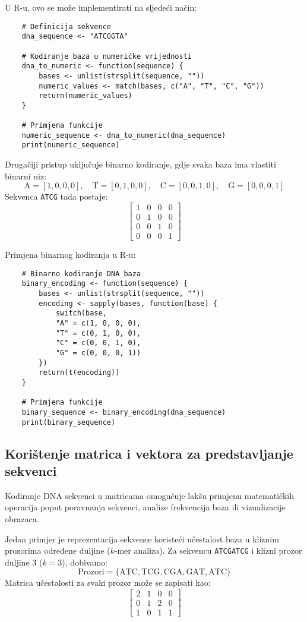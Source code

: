 \documentclass[10pt,a4paper,twoside]{article}
\begin{document}
U R-u, ovo se može implementirati na sljedeći način:
\begin{verbatim}
	# Definicija sekvence
	dna_sequence <- "ATCGGTA"
	
	# Kodiranje baza u numeričke vrijednosti
	dna_to_numeric <- function(sequence) {
		bases <- unlist(strsplit(sequence, ""))
		numeric_values <- match(bases, c("A", "T", "C", "G"))
		return(numeric_values)
	}
	
	# Primjena funkcije
	numeric_sequence <- dna_to_numeric(dna_sequence)
	print(numeric_sequence)
\end{verbatim}

Drugačiji pristup uključuje binarno kodiranje, gdje svaka baza ima vlastiti binarni niz:
\[
\text{A} = [1, 0, 0, 0], \quad \text{T} = [0, 1, 0, 0], \quad \text{C} = [0, 0, 1, 0], \quad \text{G} = [0, 0, 0, 1]
\]
Sekvenca \texttt{ATCG} tada postaje:
\[
\begin{bmatrix}
	1 & 0 & 0 & 0 \\
	0 & 1 & 0 & 0 \\
	0 & 0 & 1 & 0 \\
	0 & 0 & 0 & 1
\end{bmatrix}
\]

Primjena binarnog kodiranja u R-u:
\begin{verbatim}
	# Binarno kodiranje DNA baza
	binary_encoding <- function(sequence) {
		bases <- unlist(strsplit(sequence, ""))
		encoding <- sapply(bases, function(base) {
			switch(base,
			"A" = c(1, 0, 0, 0),
			"T" = c(0, 1, 0, 0),
			"C" = c(0, 0, 1, 0),
			"G" = c(0, 0, 0, 1))
		})
		return(t(encoding))
	}
	
	# Primjena funkcije
	binary_sequence <- binary_encoding(dna_sequence)
	print(binary_sequence)
\end{verbatim}

\subsection*{Korištenje matrica i vektora za predstavljanje sekvenci}

Kodiranje DNA sekvenci u matricama omogućuje lakšu primjenu matematičkih operacija poput poravnanja sekvenci, analize frekvencija baza ili vizualizacije obrazaca.

Jedan primjer je reprezentacija sekvence koristeći učestalost baza u kliznim prozorima određene duljine (\(k\)-mer analiza). Za sekvencu \texttt{ATCGATCG} i klizni prozor duljine 3 (\(k=3\)), dobivamo:
\[
\text{Prozori} = \{\text{ATC}, \text{TCG}, \text{CGA}, \text{GAT}, \text{ATC}\}
\]
Matrica učestalosti za svaki prozor može se zapisati kao:
\[
\begin{bmatrix}
	2 & 1 & 0 & 0 \\
	0 & 1 & 2 & 0 \\
	1 & 0 & 1 & 1
\end{bmatrix}
\]
\end{document}
